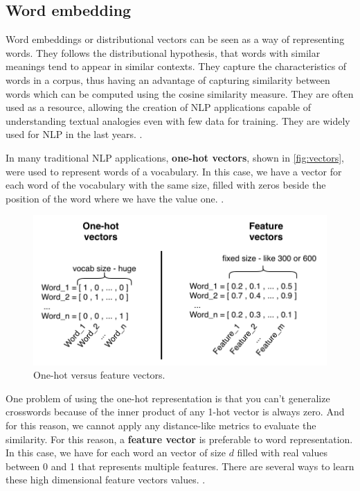 \subsection{Word embedding}\label{chap:background:we}

Word embeddings or distributional vectors can be seen as a way of representing words. They follows the distributional hypothesis, that words with similar meanings tend to appear in similar contexts. They capture the characteristics of words in a corpus, thus having an advantage of capturing similarity between words which can be computed using the cosine similarity measure. They are often used as a resource, allowing the creation of NLP applications capable of understanding textual analogies even with few data for training. They are widely used for NLP in the last years. \cite{DBLP:journals/corr/abs-1708-02709, Harris1954, Hartmann2017}.


In many traditional NLP applications, \textbf{one-hot vectors}, shown in \autoref{fig:vectors}, were used to represent words of a vocabulary. In this case, we have a vector for each word of the vocabulary with the same size, filled with zeros beside the position of the word where we have the value one. \cite{turian2010word}.

\begin{figure}[h]
	\caption{One-hot versus feature vectors.}
	\label{fig:vectors}
	\centering%
	\begin{minipage}{.7\textwidth}
		\includegraphics[width=\textwidth]{vectors.png}
	\end{minipage}
\end{figure}


One problem of using the one-hot representation is that you can't generalize crosswords because of the inner product of any 1-hot vector is always zero. And for this reason, we cannot apply any distance-like metrics to evaluate the similarity. For this reason, a \textbf{feature vector} is preferable to word representation. In this case, we have for each word an vector of size $d$ filled with real values between 0 and 1 that represents multiple features. There are several ways to learn these high dimensional feature vectors values. \cite{turian2010word}.



